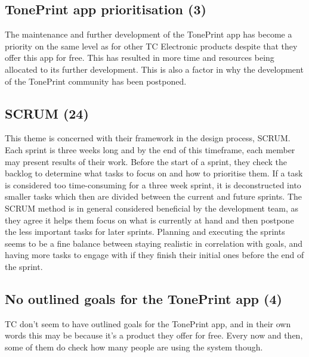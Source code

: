 \subsection*{TonePrint app prioritisation (3)} 
\label{App:ThemePrioritizingOfTheTonePrintApp}
The maintenance and further development of the TonePrint app has become a priority on the same level as for other TC Electronic products despite that they offer this app for free. This has resulted in more time and resources being allocated to its further development. This is also a factor in why the development of the TonePrint community has been postponed.

\subsection*{SCRUM (24)}
\label{App:ThemeScrum}
This theme is concerned with their framework in the design process, SCRUM. Each sprint is three weeks long and by the end of this timeframe, each member may present results of their work. Before the start of a sprint, they check the backlog to determine what tasks to focus on and how to prioritise them. If a task is considered too time-consuming for a three week sprint, it is deconstructed into smaller tasks which then are divided between the current and future sprints. The SCRUM method is in general considered beneficial by the development team, as they agree it helps them focus on what is currently at hand and then postpone the less important tasks for later sprints. Planning and executing the sprints seems to be a fine balance between staying realistic in correlation with goals, and having more tasks to engage with if they finish their initial ones before the end of the sprint.

\subsection*{No outlined goals for the TonePrint app (4)} 
\label{App:ThemeNoClearGoalsForTheToneprintApp}
TC don't seem to have outlined goals for the TonePrint app, and in their own words this may be because it's a product they offer for free. Every now and then, some of them do check how many people are using the system though.